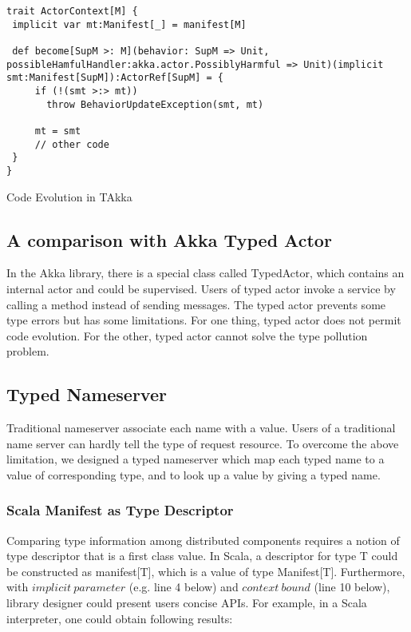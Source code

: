 \begin{table}[h]
\begin{lstlisting}
trait ActorContext[M] {
 implicit var mt:Manifest[_] = manifest[M]

 def become[SupM >: M](behavior: SupM => Unit, possibleHamfulHandler:akka.actor.PossiblyHarmful => Unit)(implicit smt:Manifest[SupM]):ActorRef[SupM] = {
     if (!(smt >:> mt))
       throw BehaviorUpdateException(smt, mt)
     
     mt = smt
     // other code
 }
}
\end{lstlisting}
\caption{Code Evolution in TAkka}
\end{table}

\subsection{A comparison with Akka Typed Actor}
In the Akka library, there is a special class called TypedActor, which contains an internal actor and could be supervised.  Users of typed actor invoke a service by calling a method instead of sending messages.  The typed actor prevents some type errors but has some limitations.  For one thing, typed actor does not permit code evolution.  For the other, typed actor cannot solve the type pollution problem.


\subsection{Typed Nameserver}
Traditional nameserver associate each name with a value.  Users of a traditional name server can hardly tell the type of request resource.  To overcome the above limitation, we designed a typed nameserver which map each typed name to a value of corresponding type, and to look up a value by giving a typed name.

\subsubsection{Scala Manifest as Type Descriptor}
Comparing type information among distributed components requires a notion of type descriptor that is a first class value.  In Scala, a descriptor for type T could be constructed as manifest[T], which is a value of type Manifest[T].  Furthermore, with $implicit\ parameter$ (e.g. line 4 below) and $context\ bound$ (line 10 below), library designer could present users concise APIs.  For example, in a Scala interpreter, one could obtain following results:

